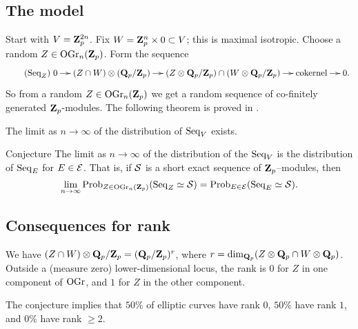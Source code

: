 \subsection{The model}

Start with $V=\mathbf{Z}_p^{2 n}$. Fix $W=\mathbf{Z}_p^n\times 0\subset V$; this is maximal 
isotropic. Choose a random $Z\in \operatorname{OGr}_n(\mathbf{Z}_p)$. Form the 
sequence 
\begin{equation*}\tag{$\sequence_Z$}\label{eq:seq-Z}
\xymatrix@=0.4cm{
  0 \ar[r] 
    & (Z\cap W)\otimes (\dQ_p/\dZ_p) \ar[r] 
    & (Z\otimes \dQ_p/\dZ_p)\cap (W\otimes \dQ_p/\dZ_p) \ar[r] 
    & \textnormal{cokernel} \ar[r] 
    & 0 .
}
\end{equation*}
So from a random $Z\in \operatorname{OGr}_n(\mathbf{Z}_p)$ we get a random 
sequence of co-finitely generated $\mathbf{Z}_p$-modules. The following theorem is 
proved in \cite{bklpr13}. 

\begin{theo}
The limit as $n\to \infty$ of the distribution of $\operatorname{Seq}_V$ exists.
\end{theo}

\begin{enonce}{Conjecture}
The limit as $n\to \infty$ of the distribution of the $\operatorname{Seq}_V$ is the 
distribution of $\operatorname{Seq}_E$ for $E\in \mathcal{E}$. That is, if $\mathcal{S}$ is a short 
exact sequence of $\mathbf{Z}_p$--modules, then 
\[
  \lim_{n\to \infty}\operatorname{Prob}_{Z\in \operatorname{OGr}_n(\mathbf{Z}_p)}(\operatorname{Seq}_Z\simeq \mathcal{S}) = \operatorname{Prob}_{E\in \mathcal{E}}(\operatorname{Seq}_E\simeq \mathcal{S}) .
\]
\end{enonce}





\subsection{Consequences for rank}

We have $(Z\cap W)\otimes \mathbf{Q}_p/\mathbf{Z}_p = (\mathbf{Q}_p/\mathbf{Z}_p)^r$, where 
$r=\dim_{\mathbf{Q}_p}(Z\otimes \mathbf{Q}_p \cap W\otimes \mathbf{Q}_p)$. Outside a (measure zero) 
lower-dimensional locus, the rank is $0$ for $Z$ in one component of 
$\operatorname{OGr}$, and $1$ for $Z$ in the other component. 

\begin{coro}
The conjecture implies that $50\%$ of elliptic curves have rank $0$, 
$50\%$ have rank $1$, and $0\%$ have rank $\geqslant 2$. 
\end{coro}






